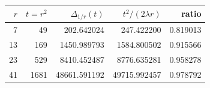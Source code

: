 \begin{tabular}{@{}rrrrr@{}}
\toprule
$r$ & $t=r^2$ & $\Delta_{1/r}(t)$ & $t^2/(2\lambda r)$ & ratio \\
\midrule
7 & 49 & 202.642024 & 247.422200 & 0.819013 \\
13 & 169 & 1450.989793 & 1584.800502 & 0.915566 \\
23 & 529 & 8410.452487 & 8776.635281 & 0.958278 \\
41 & 1681 & 48661.591192 & 49715.992457 & 0.978792 \\
\bottomrule
\end{tabular}
